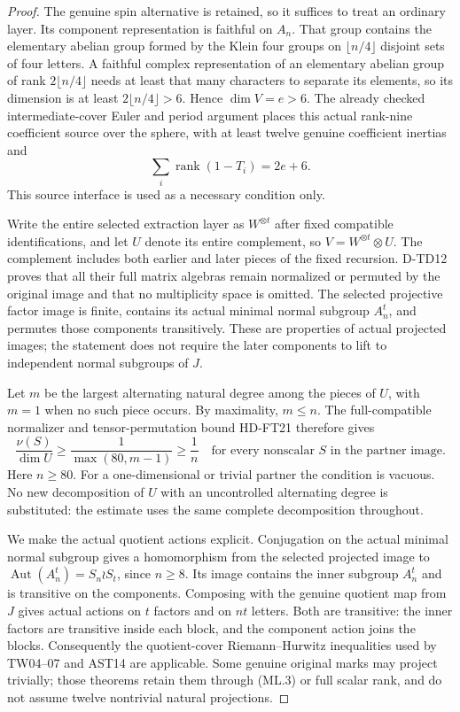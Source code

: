 \begin{proof}
The genuine spin alternative is retained, so it suffices to treat
an ordinary layer. Its component representation is faithful on
$A_n$. That group contains the elementary abelian group formed by
the Klein four groups on $\lfloor n/4\rfloor$ disjoint sets of
four letters. A faithful complex representation of an elementary
abelian group of rank $2\lfloor n/4\rfloor$ needs at least that
many characters to separate its elements, so its dimension is
at least $2\lfloor n/4\rfloor>6$. Hence $\dim V=e>6$.
The already checked intermediate-cover Euler and period argument
places this actual rank-nine coefficient source over the sphere,
with at least twelve genuine coefficient inertias and
\[
        \sum_i\operatorname{rank}(1-T_i)=2e+6.
 \tag{ML.2}
\]
This source interface is used as a necessary condition only.

Write the entire selected extraction layer as $W^{\otimes t}$ after
fixed compatible identifications, and let $U$ denote its entire
complement, so $V=W^{\otimes t}\otimes U$. The complement includes
both earlier and later pieces of the fixed recursion. D-TD12 proves
that all their full matrix algebras remain normalized or permuted
by the original image and that no multiplicity space is omitted.
The selected projective factor image is finite, contains its actual
minimal normal subgroup $A_n^t$, and permutes those components
transitively. These are properties of actual projected images;
the statement does not require the later components to lift to
independent normal subgroups of $J$.

Let $m$ be the largest alternating natural degree among the pieces
of $U$, with $m=1$ when no such piece occurs. By maximality,
$m\le n$. The full-compatible
normalizer and tensor-permutation bound HD-FT21 therefore gives
\[
 \frac{\nu(S)}{\dim U}\ge
 \frac{1}{\max(80,m-1)}\ge\frac1n
 \quad\text{for every nonscalar }S\text{ in the partner image}.
 \tag{ML.3}
\]
Here $n\ge80$. For a one-dimensional or trivial partner the
condition is vacuous. No new decomposition of $U$ with an
uncontrolled alternating degree is substituted: the estimate uses
the same complete decomposition throughout.

We make the actual quotient actions explicit. Conjugation on the
actual minimal normal subgroup gives a homomorphism from the
selected projected image to
$\operatorname{Aut}(A_n^t)=S_n\wr S_t$, since $n\ge8$.
Its image contains the inner subgroup $A_n^t$ and is transitive on
the components. Composing with the genuine quotient map from $J$
gives actual actions on $t$ factors and on $nt$ letters. Both are
transitive: the inner factors are transitive inside each block,
and the component action joins the blocks. Consequently the
quotient-cover Riemann--Hurwitz inequalities used by TW04--07 and
AST14 are applicable. Some genuine original marks may project
trivially; those theorems retain them through (ML.3) or full scalar
rank, and do not assume twelve nontrivial natural projections.


\end{proof}

